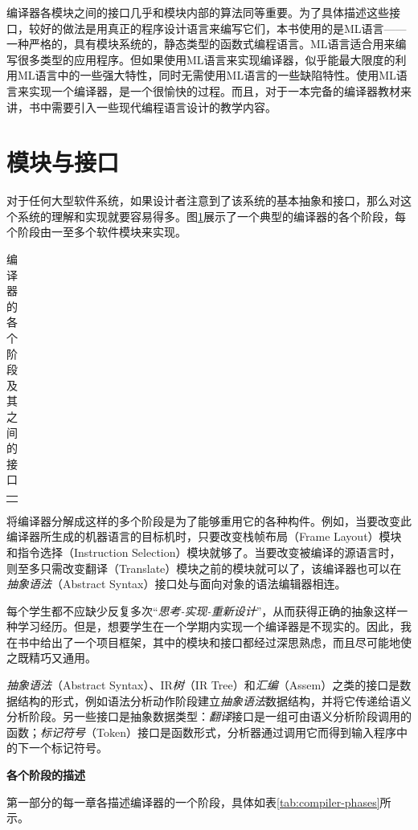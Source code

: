 \documentclass[cn,11pt,chinese]{elegantbook}
\begin{document}
编译器各模块之间的接口几乎和模块内部的算法同等重要。为了具体描述这些接口，较好的做法是用真正的程序设计语言来编写它们，本书使用的是ML语言——一种严格的，具有模块系统的，静态类型的函数式编程语言。ML语言适合用来编写很多类型的应用程序。但如果使用ML语言来实现编译器，似乎能最大限度的利用ML语言中的一些强大特性，同时无需使用ML语言的一些缺陷特性。使用ML语言来实现一个编译器，是一个很愉快的过程。而且，对于一本完备的编译器教材来讲，书中需要引入一些现代编程语言设计的教学内容。

\section{模块与接口}

对于任何大型软件系统，如果设计者注意到了该系统的基本抽象和接口，那么对这个系统的理解和实现就要容易得多。图\ref{fig:1-1}展示了一个典型的编译器的各个阶段，每个阶段由一至多个软件模块来实现。

\renewcommand\tablename{图}
\begin{table}[htbp]
	\centering
  \begin{tabular}{l}
  {
    \fontsize{6pt}{7.2pt}\selectfont
	  
  }
  \end{tabular}
  \caption{编译器的各个阶段及其之间的接口}
  \label{fig:1-1}
\end{table}
\renewcommand\tablename{表}

将编译器分解成这样的多个阶段是为了能够重用它的各种构件。例如，当要改变此编译器所生成的机器语言的目标机时，只要改变栈帧布局（Frame Layout）模块和指令选择（Instruction Selection）模块就够了。当要改变被编译的源语言时，则至多只需改变翻译（Translate）模块之前的模块就可以了，该编译器也可以在\textit{抽象语法}（Abstract Syntax）接口处与面向对象的语法编辑器相连。

每个学生都不应缺少反复多次“\textit{思考-实现-重新设计}”，从而获得正确的抽象这样一种学习经历。但是，想要学生在一个学期内实现一个编译器是不现实的。因此，我在书中给出了一个项目框架，其中的模块和接口都经过深思熟虑，而且尽可能地使之既精巧又通用。

\textit{抽象语法}（Abstract Syntax）、IR\textit{树}（IR Tree）和\textit{汇编}（Assem）之类的接口是数据结构的形式，例如语法分析动作阶段建立\textit{抽象语法}数据结构，并将它传递给语义分析阶段。另一些接口是抽象数据类型：\textit{翻译}接口是一组可由语义分析阶段调用的函数；\textit{标记符号}（Token）接口是函数形式，分析器通过调用它而得到输入程序中的下一个标记符号。

\textbf{各个阶段的描述}

第一部分的每一章各描述编译器的一个阶段，具体如表\ref{tab:compiler-phases}所示。
\end{document}
